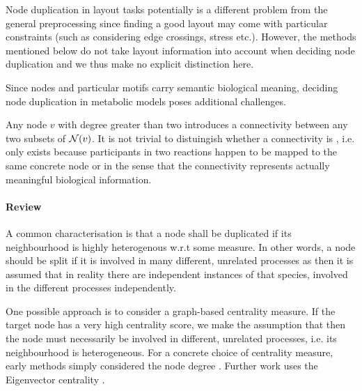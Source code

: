 \documentclass[
	fontsize=10pt, %
	twoside=false, %
	secnumdepth=1, %
]{kaobook}
\begin{document}
Node duplication in layout tasks potentially is a different problem from the
general preprocessing since finding a good layout may come with particular
constraints (such as considering edge crossings, stress etc.). However, the
methods mentioned below do not take layout information into account when
deciding node duplication and we thus make no explicit distinction here.

Since nodes and particular motifs carry semantic biological meaning, deciding
node duplication in metabolic models poses additional challenges.

Any node $v$ with degree greater than two introduces a connectivity between any
two subsets of $\mathcal{N}(v)$. It is not trivial to distuingish whether a
connectivity is , i.e. only exists because participants in two reactions
happen to be mapped to the same concrete node
or  in the sense that the connectivity represents actually meaningful
biological information.


\paragraph{Review} A common characterisation is that a node shall be duplicated if its
neighbourhood is highly heterogenous w.r.t some measure. In other words, a
node should be split if it is involved in many different, unrelated processes
as then it is assumed that in reality there are independent instances of that
species, involved in the different processes independently.

One possible approach is to consider a graph-based centrality measure. If the
target node has a very high centrality score, we make the assumption that then
the node must necessarily be involved in different, unrelated processes, i.e.
its neighbourhood is heterogeneous. For a concrete choice of centrality measure,
early methods simply considered the node degree
\cite{ma_ReconstructionMetabolicNetworks_2003} \cite{schuster_exploring_2002}.
Further work uses the Eigenvector centrality \cite{manipur_clustering_2020}.
\end{document}
